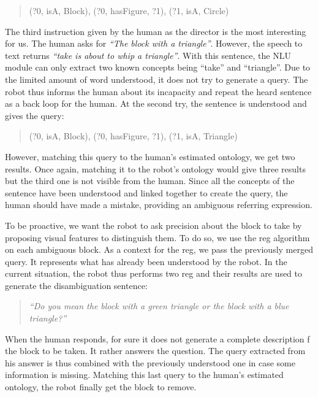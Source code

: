 \begin{quote} 
\centering 
(?0, isA, Block), (?0, hasFigure, ?1), (?1, isA, Circle)
\end{quote}

The third instruction given by the human as the director is the most interesting for us. The human asks for \textit{``The block with a triangle''}. However, the speech to text returns \textit{``take is about to whip a triangle''}. With this sentence, the NLU module can only extract two known concepts being ``take'' and ``triangle''. Due to the limited amount of word understood, it does not try to generate a \sparql{} query. The robot thus informs the human about its incapacity and repeat the heard sentence as a back loop for the human. At the second try, the sentence is understood and gives the query:

\begin{quote} 
\centering 
(?0, isA, Block), (?0, hasFigure, ?1), (?1, isA, Triangle)
\end{quote}

However, matching this query to the human's estimated ontology, we get two results. Once again, matching it to the robot's ontology would give three results but the third one is not visible from the human. Since all the concepts of the sentence have been understood and linked together to create the query, the human should have made a mistake, providing an ambiguous referring expression.

To be proactive, we want the robot to ask precision about the block to take by proposing visual features to distinguish them. To do so, we use the \acrshort{reg} algorithm on each ambiguous block. As a context for the \acrshort{reg}, we pass the previously merged \sparql{} query. It represents what has already been understood by the robot. In the current situation, the robot thus performs two \acrshort{reg} and their results are used to generate the disambiguation sentence:

\begin{quote} 
\centering 
\textit{``Do you mean the block with a green triangle or the block with a blue triangle?''}
\end{quote}

When the human responds, for sure it does not generate a complete description f the block to be taken. It rather answers the question. The query extracted from his answer is thus combined with the previously understood one in case some information is missing. Matching this last query to the human's estimated ontology, the robot finally get the block to remove.

